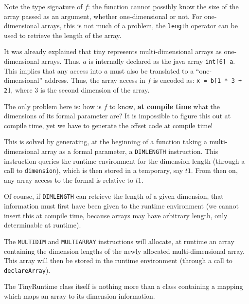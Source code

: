 \documentclass[a4paper]{article}
\begin{document}
Note the type signature of $f$: the function cannot possibly know the size of
the array passed as an argument, whether one-dimensional or not. For
one-dimensional arrays, this is not much of a problem, the
\texttt{length} operator can be used to retrieve the length of the array.

It was already explained that tiny represents multi-dimensional arrays as
one-dimensional arrays. Thus, $a$ is internally declared as the java array
\texttt{int[6] a}. This implies that any access into $a$ must also be
translated to a ``one-dimensional'' address. Thus, the array access in $f$ is
encoded as: \texttt{x = b[1 * 3 + 2]}, where $3$ is the second dimension of
the array.

The only problem here is: how is $f$ to know, \textbf{at compile time} what
the dimensions of its formal parameter are? It is impossible to figure this
out at compile time, yet we have to generate the offset code at compile time!

This is solved by generating, at the beginning of a function taking a
multi-dimensional array as a formal parameter, a \texttt{DIMLENGTH}
instruction. This instruction queries the runtime environment for the
dimension length (through a call to \texttt{dimension}),
which is then stored in a temporary, say $t1$. From then on,
any array access to the formal is relative to $t1$.

Of course, if \texttt{DIMLENGTH} can retrieve the length of a given dimension,
that information must first have been given to the runtime environment (we
cannot insert this at compile time, because arrays may have arbitrary length,
only determinable at runtime).

The \texttt{MULTIDIM} and \texttt{MULTIARRAY} instructions will allocate, at
runtime an array containing the dimension lengths of the newly allocated
multi-dimensional array. This array will then be stored in the runtime
environment (through a call to \texttt{declareArray}).

The TinyRuntime class itself is nothing more than a class containing a mapping
which maps an array to its dimension information.
\end{document}
